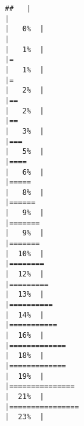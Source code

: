 \documentclass[
]{article}
\begin{document}
\begin{verbatim}
##   |                                                                              |                                                                      |   0%  |                                                                              |                                                                      |   1%  |                                                                              |=                                                                     |   1%  |                                                                              |=                                                                     |   2%  |                                                                              |==                                                                    |   2%  |                                                                              |==                                                                    |   3%  |                                                                              |===                                                                   |   5%  |                                                                              |====                                                                  |   6%  |                                                                              |=====                                                                 |   8%  |                                                                              |======                                                                |   9%  |                                                                              |=======                                                               |   9%  |                                                                              |=======                                                               |  10%  |                                                                              |========                                                              |  12%  |                                                                              |=========                                                             |  13%  |                                                                              |==========                                                            |  14%  |                                                                              |===========                                                           |  16%  |                                                                              |=============                                                         |  18%  |                                                                              |=============                                                         |  19%  |                                                                              |===============                                                       |  21%  |                                                                              |================                                                      |  23%  |                                                                              
\end{verbatim}
\end{document}

